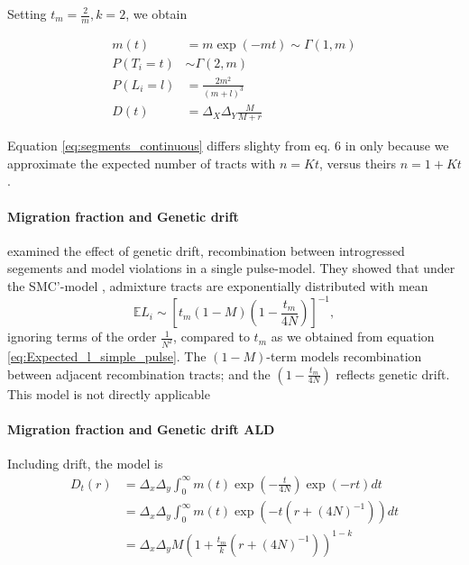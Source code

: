 \documentclass[11pt]{article}
\let\oldparagraph\paragraph
\renewcommand{\paragraph}[1]{\oldparagraph{#1}\mbox{}}
\begin{document}
Setting $t_m = \frac{2}{m}, k=2$, we obtain

\begin{subequations}
\begin{align}
    m(t) &= m \exp(-mt) \sim \Gamma(1, m)\\
    P(T_i=t) &\sim \Gamma\left(2, m\right)\\
	P(L_i=l) &= \frac{2m^2}{(m+l)^3}\label{eq:segments_continuous}\\
	D(t) &= \Delta_X\Delta_Y \frac{M}{M + r}
\end{align}
\end{subequations}
	
Equation \ref{eq:segments_continuous} differs slighty from eq. 6 in \cite{pool_inference_2009} only because we approximate the expected number of tracts with $n=Kt$, versus theirs $n=1+Kt$. 
	


\paragraph{Migration fraction and Genetic drift}
\cite{liang_lengths_2014} examined the effect of genetic drift, recombination between introgressed segements and model violations in a single pulse-model. They showed that under the SMC'-model \citep{wall_smc}, admixture tracts are exponentially distributed with mean
\begin{equation}
  \mathbb{E}L_i \sim  \left[t_m(1-M)\left(1-\frac{t_m}{4N}\right)\right]^{-1},
\end{equation}
ignoring terms of the order $\frac{1}{N^2}$, compared to $t_m$ as we obtained from equation \ref{eq:Expected_l_simple_pulse}. The $(1-M)$-term models recombination between adjacent recombination tracts; and the $\left(1-\frac{t_m}{4N}\right)$ reflects genetic drift. This model is not directly applicable 

\paragraph{Migration fraction and Genetic drift ALD}
Including drift, the model is
\begin{align}
    D_t(r) &= \Delta_x\Delta_y\int_0^\infty m(t)\exp\left(-\frac{t}{4N}\right)\exp(-rt) dt \nonumber\\
        &= \Delta_x\Delta_y\int_0^\infty m(t)\exp\left(-t(r+(4N)^{-1})\right) dt \label{eq:ld_drift}\\
&= \Delta_x\Delta_y M\left(1 + \frac{t_m}{k} (r+(4N)^{-1})\right) ^{1-k}        
\end{align}
\end{document}
